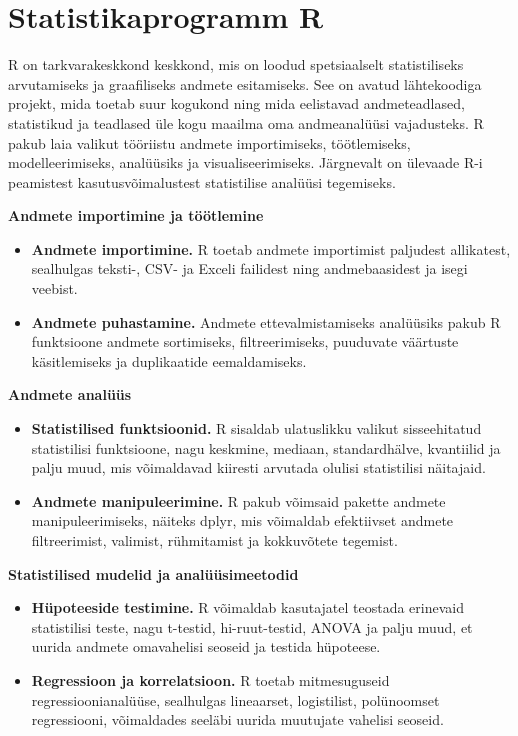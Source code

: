 \documentclass[
]{book}
\providecommand{\tightlist}{%
  \setlength{\itemsep}{0pt}\setlength{\parskip}{0pt}}
\begin{document}
\section{Statistikaprogramm R}\label{statistikaprogramm-r}

R on tarkvarakeskkond keskkond, mis on loodud spetsiaalselt statistiliseks arvutamiseks ja graafiliseks andmete esitamiseks. See on avatud lähtekoodiga projekt, mida toetab suur kogukond ning mida eelistavad andmeteadlased, statistikud ja teadlased üle kogu maailma oma andmeanalüüsi vajadusteks. R pakub laia valikut tööriistu andmete importimiseks, töötlemiseks, modelleerimiseks, analüüsiks ja visualiseerimiseks. Järgnevalt on ülevaade R-i peamistest kasutusvõimalustest statistilise analüüsi tegemiseks.

\textbf{Andmete importimine ja töötlemine}

\begin{itemize}
\tightlist
\item
  \textbf{Andmete importimine.} R toetab andmete importimist paljudest allikatest, sealhulgas teksti-, CSV- ja Exceli failidest ning andmebaasidest ja isegi veebist.
\item
  \textbf{Andmete puhastamine.} Andmete ettevalmistamiseks analüüsiks pakub R funktsioone andmete sortimiseks, filtreerimiseks, puuduvate väärtuste käsitlemiseks ja duplikaatide eemaldamiseks.
\end{itemize}

\textbf{Andmete analüüs}

\begin{itemize}
\tightlist
\item
  \textbf{Statistilised funktsioonid.} R sisaldab ulatuslikku valikut sisseehitatud statistilisi funktsioone, nagu keskmine, mediaan, standardhälve, kvantiilid ja palju muud, mis võimaldavad kiiresti arvutada olulisi statistilisi näitajaid.
\item
  \textbf{Andmete manipuleerimine.} R pakub võimsaid pakette andmete manipuleerimiseks, näiteks dplyr, mis võimaldab efektiivset andmete filtreerimist, valimist, rühmitamist ja kokkuvõtete tegemist.
\end{itemize}

\textbf{Statistilised mudelid ja analüüsimeetodid}

\begin{itemize}
\tightlist
\item
  \textbf{Hüpoteeside testimine.} R võimaldab kasutajatel teostada erinevaid statistilisi teste, nagu t-testid, hi-ruut-testid, ANOVA ja palju muud, et uurida andmete omavahelisi seoseid ja testida hüpoteese.
\item
  \textbf{Regressioon ja korrelatsioon.} R toetab mitmesuguseid regressioonianalüüse, sealhulgas lineaarset, logistilist, polünoomset regressiooni, võimaldades seeläbi uurida muutujate vahelisi seoseid.
\end{itemize}
\end{document}
